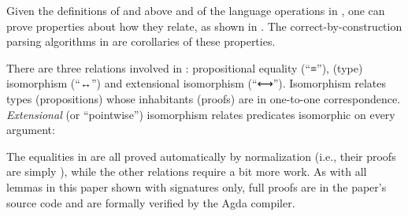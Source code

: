 \documentclass[acmsmall,screen,anonymous,timestamp]{acmart}
\begin{document}
Given the definitions of  and  above and of the language operations in , one can prove properties about how they relate, as shown in
.
The correct-by-construction parsing algorithms in  are corollaries of these properties.

There are three relations involved in : propositional equality (``≡''), (type) isomorphism (``↔'') and extensional isomorphism (``⟷'').
Isomorphism relates types (propositions) whose inhabitants (proofs) are in one-to-one correspondence.
\emph{Extensional} (or ``pointwise'') isomorphism relates predicates isomorphic on every argument:

The equalities in  are all proved automatically by normalization (i.e., their proofs are simply ), while the other relations require a bit more work.
As with all lemmas in this paper shown with signatures only, full proofs are in the paper's source code and are formally verified by the Agda compiler.


\rnc{}
\end{document}
